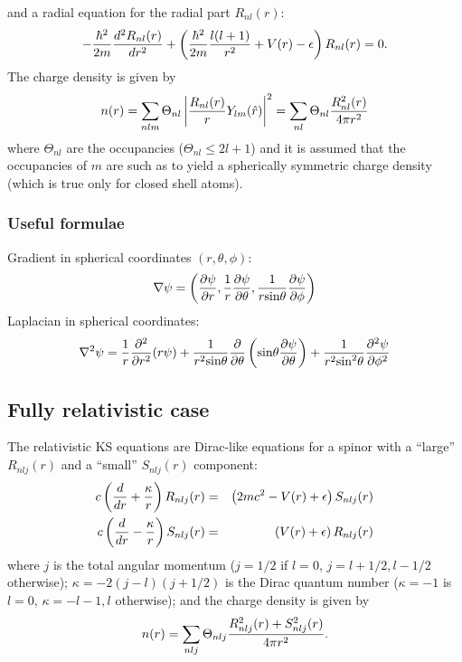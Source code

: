 and a radial equation for the radial part $R_{nl}(r)$:
\begin{equation}
-{\hbar^2\over 2m} {d^2 R_{nl}(r)\over dr^2}
+\left( {\hbar^2\over 2m} {l(l+1)\over r^2} + V(r)-\epsilon
\right) R_{nl}(r) = 0.
\end{equation}
The charge density is given by
\begin{equation}
n(r) = \sum_{nlm} \Theta_{nl}\left |{R_{nl}(r)\over r}Y_{lm}(\hat r)\right|^2 
     = \sum_{nl} \Theta_{nl}{R^2_{nl}(r)\over 4\pi r^2}
\end{equation}
where $\Theta_{nl}$ are the occupancies ($\Theta_{nl}\le 2l+1$)
and it is assumed that the occupancies of $m$ are such as to yield
a spherically symmetric charge density (which is true only for closed
shell atoms).
\subsubsection{Useful formulae} 

Gradient in spherical coordinates $(r,\theta,\phi)$:
\begin{equation}
\nabla\psi = \left({\partial\psi\over\partial r},
                   {1\over r}{\partial\psi\over\partial\theta},
                   {1\over r \mbox{sin}\theta}
                              {\partial\psi\over\partial\phi}
             \right)
\end{equation}
Laplacian in spherical coordinates:
\begin{equation}
\nabla^2\psi = {1\over r} {\partial^2\over\partial r^2}(r\psi)
             + {1\over r^2\mbox{sin}\theta} {\partial\over\partial\theta}
               \left(\mbox{sin}\theta{\partial\psi\over\partial\theta}\right)
             + {1\over r^2\mbox{sin}^2\theta}
                {\partial^2\psi\over\partial\phi^2}
\end{equation}

\subsection{Fully relativistic case} 

The relativistic KS equations are
Dirac-like equations for a spinor with a ``large'' $R_{nlj}(r)$ and
a ``small'' $S_{nlj}(r)$ component:
\begin{eqnarray}
c\left({d \over dr} + {\kappa\over r}\right)R_{nlj}(r) & = & 
       \left(2mc^2 - V(r) + \epsilon \right)S_{nlj}(r)\\
c\left({d \over dr} - {\kappa\over r}\right)S_{nlj}(r) & = & 
       \left( V(r) + \epsilon \right)       R_{nlj}(r)
\end{eqnarray}
where $j$ is the total angular momentum ($j=1/2$ if $l=0$, 
$j=l+1/2,l-1/2$ otherwise); $\kappa=-2(j-l)(j+1/2)$ is the Dirac 
quantum number ($\kappa=-1$ is $l=0$, $\kappa=-l-1,l$ otherwise);
and the charge density is given by
\begin{equation}
  n(r) = \sum_{nlj} \Theta_{nlj}{R^2_{nlj}(r)+S^2_{nlj}(r)\over 4\pi r^2}.
\end{equation}


